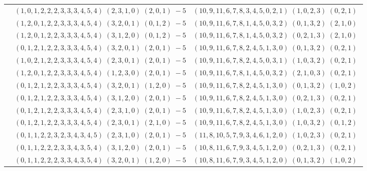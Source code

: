 \documentclass[11pt]{article}
\begin{document}
\begin{longtable}[l]{|c|c|c|}
 \cline{2-3} 
 & $(1 ,0 ,1 ,2 ,2 ,2 ,3 ,3 ,3 ,4 ,5 ,4) \;(2 ,3 ,1 ,0) \;(2 ,0 ,1) \;-5$ & $(10 ,9 ,11 ,6 ,7 ,8 ,3 ,4 ,5 ,0 ,2 ,1) \;(1 ,0 ,2 ,3) \;(0 ,2 ,1) \;$\\ 
 \cline{2-3} 
 & $(1 ,2 ,0 ,1 ,2 ,2 ,3 ,3 ,3 ,4 ,5 ,4) \;(3 ,2 ,0 ,1) \;(0 ,1 ,2) \;-5$ & $(10 ,9 ,11 ,6 ,7 ,8 ,1 ,4 ,5 ,0 ,3 ,2) \;(0 ,1 ,3 ,2) \;(2 ,1 ,0) \;$\\ 
 \cline{2-3} 
 & $(1 ,2 ,0 ,1 ,2 ,2 ,3 ,3 ,3 ,4 ,5 ,4) \;(3 ,1 ,2 ,0) \;(0 ,1 ,2) \;-5$ & $(10 ,9 ,11 ,6 ,7 ,8 ,1 ,4 ,5 ,0 ,3 ,2) \;(0 ,2 ,1 ,3) \;(2 ,1 ,0) \;$\\ 
 \cline{2-3} 
 & $(0 ,1 ,2 ,1 ,2 ,2 ,3 ,3 ,3 ,4 ,5 ,4) \;(3 ,2 ,0 ,1) \;(2 ,0 ,1) \;-5$ & $(10 ,9 ,11 ,6 ,7 ,8 ,2 ,4 ,5 ,1 ,3 ,0) \;(0 ,1 ,3 ,2) \;(0 ,2 ,1) \;$\\ 
 \cline{2-3} 
 & $(1 ,0 ,2 ,1 ,2 ,2 ,3 ,3 ,3 ,4 ,5 ,4) \;(2 ,3 ,0 ,1) \;(2 ,0 ,1) \;-5$ & $(10 ,9 ,11 ,6 ,7 ,8 ,2 ,4 ,5 ,0 ,3 ,1) \;(1 ,0 ,3 ,2) \;(0 ,2 ,1) \;$\\ 
 \cline{2-3} 
 & $(1 ,2 ,0 ,1 ,2 ,2 ,3 ,3 ,3 ,4 ,5 ,4) \;(1 ,2 ,3 ,0) \;(2 ,0 ,1) \;-5$ & $(10 ,9 ,11 ,6 ,7 ,8 ,1 ,4 ,5 ,0 ,3 ,2) \;(2 ,1 ,0 ,3) \;(0 ,2 ,1) \;$\\ 
 \cline{2-3} 
 & $(0 ,1 ,2 ,1 ,2 ,2 ,3 ,3 ,3 ,4 ,5 ,4) \;(3 ,2 ,0 ,1) \;(1 ,2 ,0) \;-5$ & $(10 ,9 ,11 ,6 ,7 ,8 ,2 ,4 ,5 ,1 ,3 ,0) \;(0 ,1 ,3 ,2) \;(1 ,0 ,2) \;$\\ 
 \cline{2-3} 
 & $(0 ,1 ,2 ,1 ,2 ,2 ,3 ,3 ,3 ,4 ,5 ,4) \;(3 ,1 ,2 ,0) \;(2 ,0 ,1) \;-5$ & $(10 ,9 ,11 ,6 ,7 ,8 ,2 ,4 ,5 ,1 ,3 ,0) \;(0 ,2 ,1 ,3) \;(0 ,2 ,1) \;$\\ 
 \cline{2-3} 
 & $(0 ,1 ,2 ,1 ,2 ,2 ,3 ,3 ,3 ,4 ,5 ,4) \;(2 ,3 ,1 ,0) \;(2 ,0 ,1) \;-5$ & $(10 ,9 ,11 ,6 ,7 ,8 ,2 ,4 ,5 ,1 ,3 ,0) \;(1 ,0 ,2 ,3) \;(0 ,2 ,1) \;$\\ 
 \cline{2-3} 
 & $(0 ,1 ,2 ,1 ,2 ,2 ,3 ,3 ,3 ,4 ,5 ,4) \;(2 ,3 ,0 ,1) \;(2 ,1 ,0) \;-5$ & $(10 ,9 ,11 ,6 ,7 ,8 ,2 ,4 ,5 ,1 ,3 ,0) \;(1 ,0 ,3 ,2) \;(0 ,1 ,2) \;$\\ 
 \cline{2-3} 
 & $(0 ,1 ,1 ,2 ,2 ,3 ,2 ,3 ,4 ,3 ,4 ,5) \;(2 ,3 ,1 ,0) \;(2 ,0 ,1) \;-5$ & $(11 ,8 ,10 ,5 ,7 ,9 ,3 ,4 ,6 ,1 ,2 ,0) \;(1 ,0 ,2 ,3) \;(0 ,2 ,1) \;$\\ 
 \cline{2-3} 
 & $(0 ,1 ,1 ,2 ,2 ,2 ,3 ,3 ,4 ,3 ,5 ,4) \;(3 ,1 ,2 ,0) \;(2 ,0 ,1) \;-5$ & $(10 ,8 ,11 ,6 ,7 ,9 ,3 ,4 ,5 ,1 ,2 ,0) \;(0 ,2 ,1 ,3) \;(0 ,2 ,1) \;$\\ 
 \cline{2-3} 
 & $(0 ,1 ,1 ,2 ,2 ,2 ,3 ,3 ,4 ,3 ,5 ,4) \;(3 ,2 ,0 ,1) \;(1 ,2 ,0) \;-5$ & $(10 ,8 ,11 ,6 ,7 ,9 ,3 ,4 ,5 ,1 ,2 ,0) \;(0 ,1 ,3 ,2) \;(1 ,0 ,2) \;$\\ 

\end{longtable}
\end{document}
